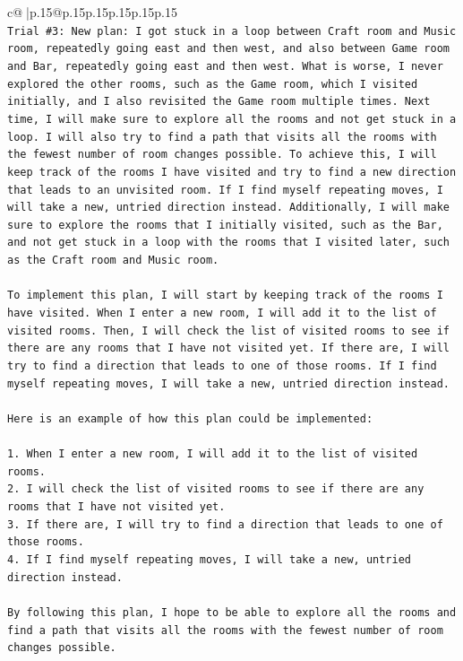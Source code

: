 \documentclass{article}
\begin{document}
{\begin{supertabular}{c@{$\;$}|p{.15\linewidth}@{}p{.15\linewidth}p{.15\linewidth}p{.15\linewidth}p{.15\linewidth}p{.15\linewidth}}
{{{\\ 
\texttt{Trial \#3: New plan: I got stuck in a loop between Craft room and Music room, repeatedly going east and then west, and also between Game room and Bar, repeatedly going east and then west. What is worse, I never explored the other rooms, such as the Game room, which I visited initially, and I also revisited the Game room multiple times. Next time, I will make sure to explore all the rooms and not get stuck in a loop. I will also try to find a path that visits all the rooms with the fewest number of room changes possible. To achieve this, I will keep track of the rooms I have visited and try to find a new direction that leads to an unvisited room. If I find myself repeating moves, I will take a new, untried direction instead. Additionally, I will make sure to explore the rooms that I initially visited, such as the Bar, and not get stuck in a loop with the rooms that I visited later, such as the Craft room and Music room. } \\
\\ 
\texttt{To implement this plan, I will start by keeping track of the rooms I have visited. When I enter a new room, I will add it to the list of visited rooms. Then, I will check the list of visited rooms to see if there are any rooms that I have not visited yet. If there are, I will try to find a direction that leads to one of those rooms. If I find myself repeating moves, I will take a new, untried direction instead. } \\
\\ 
\texttt{Here is an example of how this plan could be implemented:} \\
\\ 
\texttt{1. When I enter a new room, I will add it to the list of visited rooms.} \\
\texttt{2. I will check the list of visited rooms to see if there are any rooms that I have not visited yet.} \\
\texttt{3. If there are, I will try to find a direction that leads to one of those rooms.} \\
\texttt{4. If I find myself repeating moves, I will take a new, untried direction instead.} \\
\\ 
\texttt{By following this plan, I hope to be able to explore all the rooms and find a path that visits all the rooms with the fewest number of room changes possible.} \\
\\ 
\\ 
}}}
\end{supertabular}}
\end{document}
